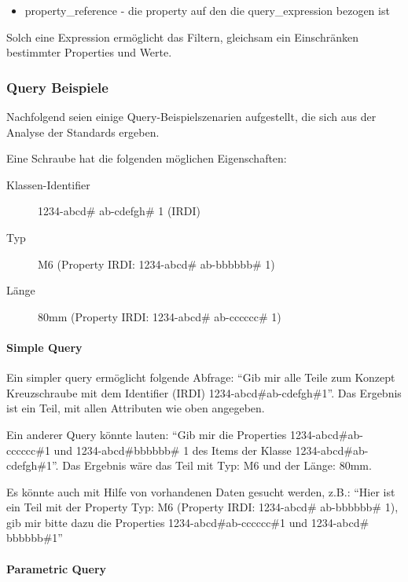 \begin{itemize}
\item property\_reference - die property auf den die query\_expression bezogen ist
\end{itemize}
Solch eine Expression ermöglicht das Filtern, gleichsam ein Einschränken bestimmter Properties und Werte. 

\subsubsection{Query Beispiele}\label{kap:query_beispiele}

Nachfolgend seien einige Query-Beispielszenarien aufgestellt, die sich aus der Analyse der Standards ergeben.

Eine Schraube hat die folgenden möglichen Eigenschaften: 

\begin{description}
\item[Klassen-Identifier] 1234-abcd\# ab-cdefgh\# 1 (IRDI)
\item[Typ] M6 (Property IRDI: 1234-abcd\# ab-bbbbbb\# 1)
\item[Länge] 80mm (Property IRDI: 1234-abcd\# ab-cccccc\# 1)
\end{description}

\paragraph{Simple Query}

Ein simpler query ermöglicht folgende Abfrage: \enquote{Gib mir alle Teile zum Konzept Kreuzschraube mit dem Identifier (IRDI) 1234-abcd\#ab-cdefgh\#1}. Das Ergebnis ist ein Teil, mit allen Attributen wie oben angegeben. 

Ein anderer Query könnte lauten: \enquote{Gib mir die Properties 1234-abcd\#ab-cccccc\#1 und 1234-abcd\#bbbbbb\# 1 des Items der Klasse 1234-abcd\#ab-cdefgh\#1}. Das Ergebnis wäre das Teil mit Typ: M6 und der Länge: 80mm.

Es könnte auch mit Hilfe von vorhandenen Daten gesucht werden, z.B.:  \enquote{Hier ist ein Teil mit der Property Typ: M6 (Property IRDI: 1234-abcd\# ab-bbbbbb\# 1), gib mir bitte dazu die Properties 1234-abcd\#ab-cccccc\#1 und 1234-abcd\# bbbbbb\#1} 

\paragraph{Parametric Query}

